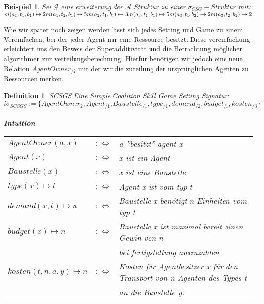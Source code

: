 \documentclass[12pt]{article}
\theoremstyle{break}
\newtheorem{definition}{Definition}
\newtheorem{bsp}{Beispiel}
\begin{document}
\begin{bsp}
  Sei $\mathcal{G}$ eine erweiterung der $\mathcal{A}$ Struktur zu einer $\sigma_{CSG}-$Struktur mit:\\
  $
  m(a_1, t_1, b_1) \mapsto 2 \\
  m(a_1, t_2, b_1) \mapsto 5 \\
  m(a_2, t_1, b_1) \mapsto 3 \\
  m(a_3, t_1, b_1) \mapsto 5 \\
  m(a_3, t_1, b_2) \mapsto 2 \\
  m(a_3, t_2, b_2) \mapsto 2
  $
\end{bsp}

Wie wir später noch zeigen werden lässt sich jedes Setting und Game zu einem Vereinfachen, bei der jeder Agent nur eine Ressource besitzt. Diese vereinfachung erleichtert uns den Beweis der Superadditivität und die Betrachtung möglicher algorithmen zur verteilungsberechnung. Hierfür benötigen wir jedoch eine neue Relation $AgentOwner_{/2}$ mit der wir die zuteilung der ursprünglichen Agenten zu Ressourcen merken.

\begin{definition}{SCSGS}
  Eine Simple Coalition Skill Game Setting Signatur:
  \[ i
    \sigma_{SCSGS}:= \{AgentOwner_{2}, Agent_{/1}, Baustelle_{/1}, type_{/1}, demand_{/2}, budget_{/1}, kosten_{/3} \}
  \]
  \\ \textbf{Intuition} \\
  \begin{tabular}{lrl}
    $AgentOwner(a, x)$&$:\Leftrightarrow$& a ''besitzt'' agent x \\
    $Agent(x)$&$:\Leftrightarrow$& x ist ein Agent \\
    $Baustelle(x) $&$:\Leftrightarrow$& x ist eine Baustelle \\
    $type(x)\mapsto t $&$:\Leftrightarrow$& Agent x ist vom typ t \\
    $demand(x, t)\mapsto n $&$:\Leftrightarrow$& Baustelle x benötigt n Einheiten vom typ t \\
    $budget(x)\mapsto n $&$:\Leftrightarrow$&
    Baustelle x ist maximal bereit einen Gewin von n\\&& bei fertigstellung auszuzahlen\\
    $kosten(t, n, a, y)\mapsto n$&$:\Leftrightarrow$& Kosten für Agentbesitzer x für den Transport von n Agenten des Types t\\&& an die Baustelle y.
  \end{tabular}
\end{definition}
\end{document}

